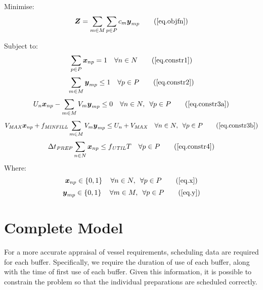 Minimise:
\begin{equation}
    \boldsymbol{Z} = \sum_{m \in M} \sum_{p \in P} c_m \boldsymbol{y}_{mp}
    \tag{\ref{eq.objfn}}
\end{equation}

Subject to:
\begin{equation}
    \sum_{p \in P} \boldsymbol{x}_{np} = 1 \quad \forall n \in N
    \tag{\ref{eq.constr1}}
\end{equation}
\begin{equation}
    \sum_{m \in M} \boldsymbol{y}_{mp} \le 1 \quad \forall p \in P
    \tag{\ref{eq.constr2}}
\end{equation}
\begin{equation}
    U_{n} \boldsymbol{x}_{np} - \sum_{m \in M} V_{m} \boldsymbol{y}_{mp} \le 0
    \quad \forall n \in N, \enspace \forall p \in P
    \tag{\ref{eq.constr3a}}
\end{equation}
\begin{equation}
    V_{\mathit{MAX}} \boldsymbol{x}_{np} + f_{\mathit{MINFILL}} \sum_{m \in M}
    V_{m} \boldsymbol{y}_{mp} \le U_{n} + V_{\mathit{MAX}} \quad \forall n \in
    N, \enspace \forall p \in P
    \tag{\ref{eq.constr3b}}
\end{equation}
\begin{equation}
    \Delta t_{\mathit{PREP}} \sum_{n \in N} \boldsymbol{x}_{np} \le
    f_{\mathit{UTIL}} T \quad \forall p \in P
    \tag{\ref{eq.constr4}}
\end{equation}
Where:
\begin{equation}
    \boldsymbol{x}_{np} \in \left\{ 0, 1 \right\} \quad \forall n \in N,
    \enspace \forall p \in P
    \tag{\ref{eq.x}}
\end{equation}
\begin{equation}
    \boldsymbol{y}_{mp} \in \left\{ 0, 1 \right\} \quad \forall m \in M,
    \enspace \forall p \in P
    \tag{\ref{eq.y}}
\end{equation}

\section{Complete Model}\label{S.completemodel}

For a more accurate appraisal of vessel requirements, scheduling data are
required for each buffer.
Specifically, we require the duration of use of each buffer, along with the
time of first use of each buffer.
Given this information, it is possible to constrain the problem so that the
individual preparations are scheduled correctly.

